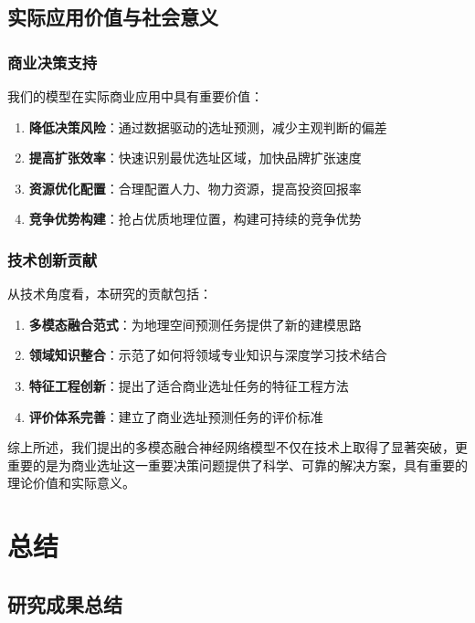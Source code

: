 \documentclass{article}
\begin{document}
\subsection{实际应用价值与社会意义}

\subsubsection{商业决策支持}

我们的模型在实际商业应用中具有重要价值：

\begin{enumerate}
\item \textbf{降低决策风险}：通过数据驱动的选址预测，减少主观判断的偏差
\item \textbf{提高扩张效率}：快速识别最优选址区域，加快品牌扩张速度
\item \textbf{资源优化配置}：合理配置人力、物力资源，提高投资回报率
\item \textbf{竞争优势构建}：抢占优质地理位置，构建可持续的竞争优势
\end{enumerate}

\subsubsection{技术创新贡献}

从技术角度看，本研究的贡献包括：

\begin{enumerate}
\item \textbf{多模态融合范式}：为地理空间预测任务提供了新的建模思路
\item \textbf{领域知识整合}：示范了如何将领域专业知识与深度学习技术结合
\item \textbf{特征工程创新}：提出了适合商业选址任务的特征工程方法
\item \textbf{评价体系完善}：建立了商业选址预测任务的评价标准
\end{enumerate}

综上所述，我们提出的多模态融合神经网络模型不仅在技术上取得了显著突破，更重要的是为商业选址这一重要决策问题提供了科学、可靠的解决方案，具有重要的理论价值和实际意义。

\section{总结}

\subsection{研究成果总结}
\end{document}
